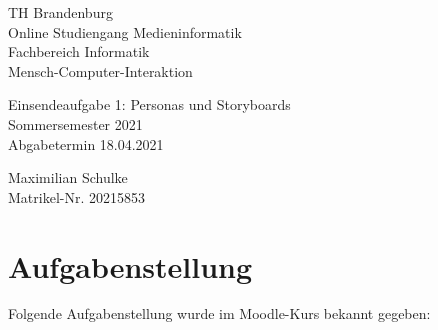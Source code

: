 \documentclass{article}
\begin{document}
\begin{titlepage}
	\begin{flushleft}
		TH Brandenburg \\
		Online Studiengang Medieninformatik \\
		Fachbereich Informatik \\
		Mensch-Computer-Interaktion
	\end{flushleft}

	\vfill

	\begin{center}
		\Large{Einsendeaufgabe 1: Personas und Storyboards}\\[0.5em]
		\large{Sommersemester 2021}\\[0.25em]
		\large{Abgabetermin 18.04.2021}
	\end{center}

	\vfill

	\begin{flushright}
		Maximilian Schulke \\
		Matrikel-Nr. 20215853
	\end{flushright}
\end{titlepage}

\tableofcontents

\vfill

\section{Aufgabenstellung}

Folgende Aufgabenstellung wurde im Moodle-Kurs bekannt gegeben:
\end{document}
